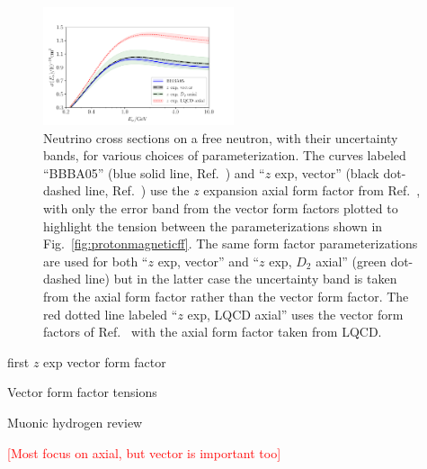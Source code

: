 \begin{figure}[hbt!]
 \centering
 \includegraphics[width=0.5\textwidth]{plots/xsec_comparison-standalone.pdf}
\caption{
 Neutrino cross sections on a free neutron, with their uncertainty bands,
 for various choices of parameterization.
 The curves labeled ``BBBA05'' (blue solid line, Ref.~\cite{Bradford:2006yz})
 and ``$z$ exp, vector'' (black dot-dashed line, Ref.~\cite{Borah:2020gte}) use the
 $z$ expansion axial form factor from Ref.~\cite{Meyer:2016oeg},
 with only the error band from the vector form factors plotted
 to highlight the tension between the parameterizations shown in Fig.~\ref{fig:protonmagneticff}.
 The same form factor parameterizations are used for both ``$z$ exp, vector'' and
 ``$z$ exp, $D_{2}$ axial'' (green dot-dashed line)
 but in the latter case the uncertainty band is taken from the axial form factor
 rather than the vector form factor.
 The red dotted line labeled ``$z$ exp, LQCD axial'' uses the vector form factors
 of Ref.~\cite{Borah:2020gte} with the axial form factor taken from LQCD.
 \label{fig:nucleonxsec}
}
\end{figure}

\begin{description}
\item[first $z$ exp vector form factor] \cite{Ye:2017gyb}
\item[Vector form factor tensions] \cite{Borah:2020gte}
\item[Muonic hydrogen review] \cite{Hill:2017wgb}
\end{description}

\textcolor{red}{[Most focus on axial, but vector is important too]}
